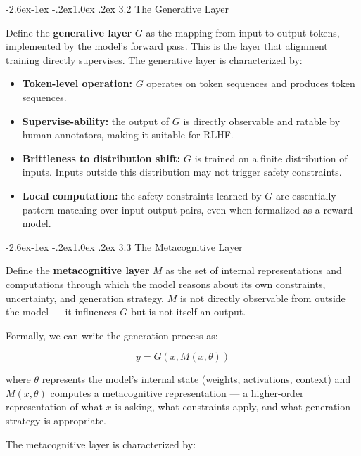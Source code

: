 \documentclass[
  11pt,
]{article}
\makeatletter
\providecommand{\tightlist}{%
  \setlength{\itemsep}{0pt}\setlength{\parskip}{0pt}}
\renewcommand\subsection{\@startsection{subsection}{2}{\z@}%
  {-2.6ex\@plus -1ex \@minus -.2ex}{1.0ex \@plus .2ex}%
  {\normalfont\sffamily\large\bfseries}}
\makeatother
\begin{document}
\subsection{3.2 The Generative Layer}\label{the-generative-layer}

Define the \textbf{generative layer} \(G\) as the mapping from input to
output tokens, implemented by the model's forward pass. This is the
layer that alignment training directly supervises. The generative layer
is characterized by:

\begin{itemize}
\tightlist
\item
  \textbf{Token-level operation:} \(G\) operates on token sequences and
  produces token sequences.
\item
  \textbf{Supervise-ability:} the output of \(G\) is directly observable
  and ratable by human annotators, making it suitable for RLHF.
\item
  \textbf{Brittleness to distribution shift:} \(G\) is trained on a
  finite distribution of inputs. Inputs outside this distribution may
  not trigger safety constraints.
\item
  \textbf{Local computation:} the safety constraints learned by \(G\)
  are essentially pattern-matching over input-output pairs, even when
  formalized as a reward model.
\end{itemize}

\subsection{3.3 The Metacognitive Layer}\label{the-metacognitive-layer}

Define the \textbf{metacognitive layer} \(M\) as the set of internal
representations and computations through which the model reasons about
its own constraints, uncertainty, and generation strategy. \(M\) is not
directly observable from outside the model --- it influences \(G\) but
is not itself an output.

Formally, we can write the generation process as:

\[y = G(x, M(x, \theta))\]

where \(\theta\) represents the model's internal state (weights,
activations, context) and \(M(x, \theta)\) computes a metacognitive
representation --- a higher-order representation of what \(x\) is
asking, what constraints apply, and what generation strategy is
appropriate.

The metacognitive layer is characterized by:
\end{document}
